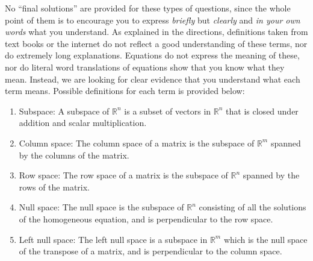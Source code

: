No ``final solutions'' are provided for these types of questions, since the
whole point of them is to encourage you to express \emph{briefly} but
\emph{clearly} and \emph{in your own words} what you understand. As
explained in the directions, definitions taken from text books or the
internet do not reflect a good understanding of these terms, nor do
extremely long explanations. Equations do not express the meaning of these,
nor do literal word translations of equations show that you know what they
mean. Instead, we are looking for clear evidence that you understand what
each term means. Possible definitions for each term is provided below: 
\begin{mdframed}[style=MyFrame]
    \begin{enumerate}[label=(\alph*)]
        \item Subspace: A subspace of $\mathbb{R}^{n}$ is a subset of
            vectors in $\mathbb{R}^{n}$ that is closed under addition and
            scalar multiplication.
            
        \item Column space: The column space of a matrix is the subspace of
            $\mathbb{R}^{m}$ spanned by the columns of the matrix.

        \item Row space: The row space of a matrix is the subspace of
            $\mathbb{R}^{n}$ spanned by the rows of the matrix.
            
        \item Null space: The null space is the subspace of
            $\mathbb{R}^{n}$ consisting of all the solutions of the
            homogeneous equation, and is perpendicular to the row space.

        \item Left null space: The left null space is a subspace in
            $\mathbb{R}^{m}$ which is the null space of the transpose of a
            matrix, and is perpendicular to the column space. 
    \end{enumerate}
\end{mdframed}
